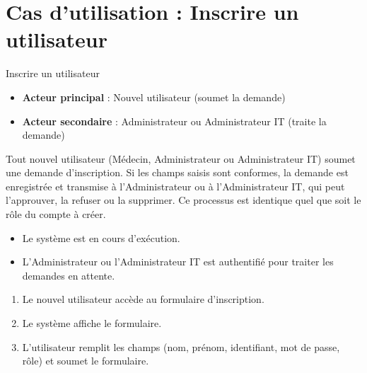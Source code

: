 \documentclass[11pt]{article}
\begin{document}
\section*{Cas d'utilisation : Inscrire un utilisateur}

\begin{description}[leftmargin=4.2cm, style=nextline]
    \item[Titre de cas d'utilisation] Inscrire un utilisateur

    \item[Acteurs]
    \begin{itemize}[leftmargin=*, nosep]
        \item \textbf{Acteur principal} : Nouvel utilisateur (soumet la demande)
        \item \textbf{Acteur secondaire} : Administrateur ou Administrateur IT
              (traite la demande)
    \end{itemize}

    \item[Description] Tout nouvel utilisateur (Médecin, Administrateur ou
    Administrateur IT) soumet une demande d'inscription. Si les champs saisis
    sont conformes, la demande est enregistrée et transmise à l'Administrateur
    ou à l'Administrateur IT, qui peut l'approuver, la refuser ou la supprimer.
    Ce processus est identique quel que soit le rôle du compte à créer.

    \item[Préconditions]
    \begin{itemize}[leftmargin=*, nosep]
        \item Le système est en cours d'exécution.
        \item L'Administrateur ou l'Administrateur IT est authentifié pour
              traiter les demandes en attente.
    \end{itemize}

    \item[Scénario principal]
    \begin{enumerate}[leftmargin=*, topsep=0pt, itemsep=0pt]
        \item Le nouvel utilisateur accède au formulaire d'inscription.
        \item Le système affiche le formulaire.
        \item L'utilisateur remplit les champs (nom, prénom, identifiant,
              mot de passe, rôle) et soumet le formulaire.
    \end{enumerate}


\end{description}
\end{document}
